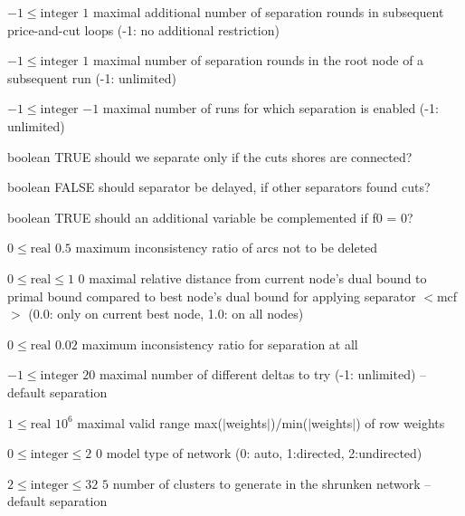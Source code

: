 %
{$-1\leq\textrm{integer}$}%
{$1$}%
{maximal additional number of separation rounds in subsequent price-and-cut loops (-1: no additional restriction)}%
{}

%
{$-1\leq\textrm{integer}$}%
{$1$}%
{maximal number of separation rounds in the root node of a subsequent run (-1: unlimited)}%
{}

%
{$-1\leq\textrm{integer}$}%
{$-1$}%
{maximal number of runs for which separation is enabled (-1: unlimited)}%
{}

%
{boolean}%
{TRUE}%
{should we separate only if the cuts shores are connected?}%
{}

%
{boolean}%
{FALSE}%
{should separator be delayed, if other separators found cuts?}%
{}

%
{boolean}%
{TRUE}%
{should an additional variable be complemented if f0 = 0?}%
{}

%
{$0\leq\textrm{real}$}%
{$0.5$}%
{maximum inconsistency ratio of arcs not to be deleted}%
{}

%
{$0\leq\textrm{real}\leq1$}%
{$0$}%
{maximal relative distance from current node's dual bound to primal bound compared to best node's dual bound for applying separator $<$mcf$>$ (0.0: only on current best node, 1.0: on all nodes)}%
{}

%
{$0\leq\textrm{real}$}%
{$0.02$}%
{maximum inconsistency ratio for separation at all}%
{}

%
{$-1\leq\textrm{integer}$}%
{$20$}%
{maximal number of different deltas to try (-1: unlimited)  -- default separation}%
{}

%
{$1\leq\textrm{real}$}%
{$10^{  6}$}%
{maximal valid range max($|$weights$|$)/min($|$weights$|$) of row weights}%
{}

%
{$0\leq\textrm{integer}\leq2$}%
{$0$}%
{model type of network (0: auto, 1:directed, 2:undirected)}%
{}

%
{$2\leq\textrm{integer}\leq32$}%
{$5$}%
{number of clusters to generate in the shrunken network -- default separation}%
{}

